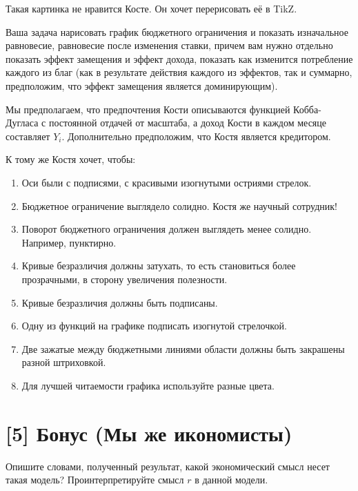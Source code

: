\documentclass[12pt, a4paper, oneside]{article}
\begin{document}
Такая картинка не нравится Косте. Он хочет перерисовать её в TikZ. 


Ваша задача нарисовать график бюджетного ограничения и показать изначальное равновесие,  равновесие после изменения ставки, причем вам нужно отдельно показать эффект замещения и эффект дохода, показать как изменится потребление каждого из благ (как в результате действия каждого из эффектов, так и суммарно, предположим, что эффект замещения является доминирующим). 

 Мы предполагаем, что предпочтения Кости описываются функцией Кобба-Дугласа с постоянной отдачей от масштаба, а доход Кости в каждом месяце составляет $Y_i$. Дополнительно предположим, что Костя является кредитором.
 
К тому же Костя хочет, чтобы: 

\begin{enumerate}
	
\item  Оси были с подписями, с красивыми изогнутыми остриями стрелок.
\item  Бюджетное ограничение выглядело солидно. Костя же научный сотрудник! 
\item Поворот бюджетного ограничения должен выглядеть менее солидно. Например, пунктирно. 
\item  Кривые безразличия должны затухать, то есть становиться более прозрачными, в сторону увеличения полезности.
\item  Кривые безразличия должны быть подписаны. 
\item  Одну из функций на графике подписать изогнутой стрелочкой. 
\item Две зажатые между бюджетными линиями области должны быть закрашены разной штриховкой. 
\item Для лучшей читаемости графика используйте разные цвета.
\end{enumerate}

\section*{[5]  Бонус (Мы же икономисты)}

Опишите словами, полученный результат, какой экономический смысл несет такая модель? Проинтерпретируйте смысл $r$ в данной модели. 
\end{document}
